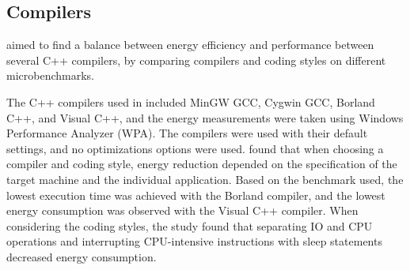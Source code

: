 \subsection{Compilers}
\cite{hassan2017} aimed to find a balance between energy efficiency and performance between several C++ compilers, by comparing compilers and coding styles on different microbenchmarks.

The C++ compilers used in \cite{hassan2017} included MinGW GCC, Cygwin GCC, Borland C++, and Visual C++, and the energy measurements were taken using Windows Performance Analyzer (WPA). The compilers were used with their default settings, and no optimizations options were used. %
\cite{hassan2017} found that when choosing a compiler and coding style, energy reduction depended on the specification of the target machine and the individual application. Based on the benchmark used, the lowest execution time was achieved with the Borland compiler, and the lowest energy consumption was observed with the Visual C++ compiler. When considering the coding styles, the study found that separating IO and CPU operations and interrupting CPU-intensive instructions with sleep statements decreased energy consumption.